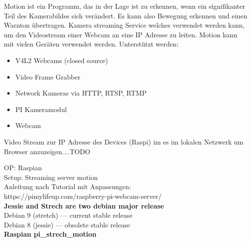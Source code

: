 Motion ist ein Programm, das in der Lage ist zu erkennen, wenn ein signifikanter Teil des Kamerabildes sich verändert. Es kann also Bewegung erkennen und einen Warnton übertragen. Kamera streaming Service welches verwendet werden kann, um den Videostream einer Webcam an eine IP Adresse zu leiten. Motion kann mit vielen Geräten verwendet werden. Unterstützt werden:
\begin{itemize}
\item V4L2 Webcams (closed source)
\item Video Frame Grabber
\item Network Kameras via HTTP, RTSP, RTMP
\item PI Kameramodul
\item Webcam
\end{itemize}

Video Stream zur IP Adresse des Devices (Raspi) im es im lokalen 
Netzwerk um Browser anzuzeigen....TODO

OP: Raspian\\
Setup: Streaming server motion\\

Anleitung nach Tutorial mit Anpassungen:\\
https://pimylifeup.com/raspberry-pi-webcam-server/\\

\textbf{Jessie and Strech are two debian major release}\\
Debian 9 (stretch) — current stable release\\
Debian 8 (jessie) — obsolete stable release\\

\textbf{Raspian pi\_strech\_motion}

